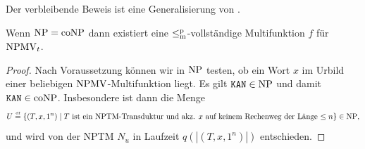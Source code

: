 Der verbleibende Beweis ist eine Generalisierung von \textcite{dingel_separation_2022}.
\begin{theorem}\label{thm:npmvt-vs-npconp}
    Wenn $\mathrm{NP}=\mathrm{coNP}$ dann existiert eine $\leq_\mathrm{m}^\mathrm{p}$-vollständige Multifunktion $f$ für $\mathrm{NPMV}_t$.
\end{theorem}
\begin{proof}
    Nach Voraussetzung können wir in $\mathrm{NP}$ testen, ob ein Wort $x$ im Urbild einer beliebigen $\mathrm{NPMV}$-Multifunktion liegt.
    Es gilt $\mathtt{KAN}\in\mathrm{NP}$ und damit $\mathtt{KAN}\in\mathrm{coNP}$. Insbesondere ist dann die Menge
    \[ U \stackrel{\text{\smash{\tiny df}}}{=}  \{ (T, x, 1^n) \mid \text{$T$ ist ein NPTM-Transduktur und akz. $x$ auf keinem Rechenweg der Länge $\leq n$} \} \in\mathrm{NP},  \]
    und wird von der NPTM $N_u$ in Laufzeit $q(|(T, x, 1^n)|)$ entschieden.


\end{proof}
